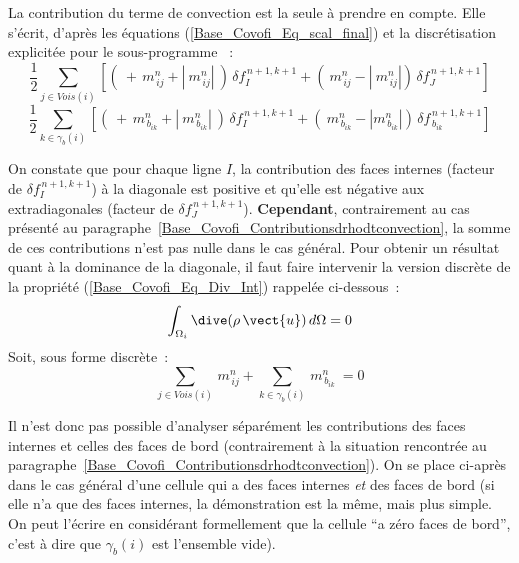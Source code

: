 La contribution du terme de convection est la seule à prendre en compte. Elle
s'écrit, d'après les équations (\ref{Base_Covofi_Eq_scal_final}) et la discrétisation
explicitée pour le sous-programme ~:
\begin{equation}\label{Base_Covofi_Eq_Sans_Faces_Int}
\displaystyle\frac{1}{2}\sum\limits_{j\in Vois(i)}\left[(\ +\,m_{\,ij}^n + |\
m_{\,ij}^n|\ )\,\delta f_I^{\,n+1,k+1}+ (\ m_{\,ij}^n - |\ m_{\,ij}^n|)\,\delta f_J^{\,n+1,k+1}\right]
\end{equation}
\begin{equation}\label{Base_Covofi_Eq_Sans_Faces_Bord}
\displaystyle\frac{1}{2}\sum\limits_{k\in {\gamma_b(i)}}\left[(\ +\,
m_{\,{b}_{ik}}^n + |\ m_{\,{b}_{ik}}^n|\ )\,\delta f_I^{\,n+1,k+1} + (\
m_{\,{b}_{ik}}^n - |m_{\,{b}_{ik}}^n|)\,\delta f_{\,{b}_{ik}}^{\,n+1,k+1}\right]
\end{equation}


On constate que pour chaque ligne $I$,  la contribution des faces
internes (facteur de $\delta f_I^{\,n+1,k+1}$) à la diagonale est positive et
qu'elle est négative aux extradiagonales (facteur de $\delta
f_J^{\,n+1,k+1}$). {\bf Cependant}, contrairement au cas présenté au
paragraphe~\ref{Base_Covofi_Contributionsdrhodtconvection}, la
somme de ces contributions n'est pas nulle dans le cas général. Pour obtenir
un résultat quant à la dominance de la diagonale, il faut faire intervenir
la version discrète de la propriété (\ref{Base_Covofi_Eq_Div_Int})
rappelée ci-dessous~: $$\displaystyle \int_{\Omega_i} \dive (\rho\,\vect{u})\,
d\Omega = 0$$
Soit, sous forme discrète~:
\begin{equation}\label{Base_Covofi_Eq_Continuite_discrete}
\sum\limits_{j\in Vois(i)}\,m_{\,ij}^n
+ \sum\limits_{k\in {\gamma_b(i)}}\,m_{\,{b}_{ik}}^n\ = 0
\end{equation}

Il n'est donc pas possible d'analyser
séparément les contributions des faces internes et celles des faces
de bord (contrairement à la situation rencontrée au
paragraphe~\ref{Base_Covofi_Contributionsdrhodtconvection}). On se place ci-après dans le
cas général d'une cellule qui a des faces internes {\em et} des faces de
bord (si elle n'a que des faces internes, la démonstration est la même, mais
plus simple. On peut l'écrire en considérant formellement que la cellule
``a zéro faces de bord'', c'est à dire que $\gamma_b(i)$ est l'ensemble vide). \\

